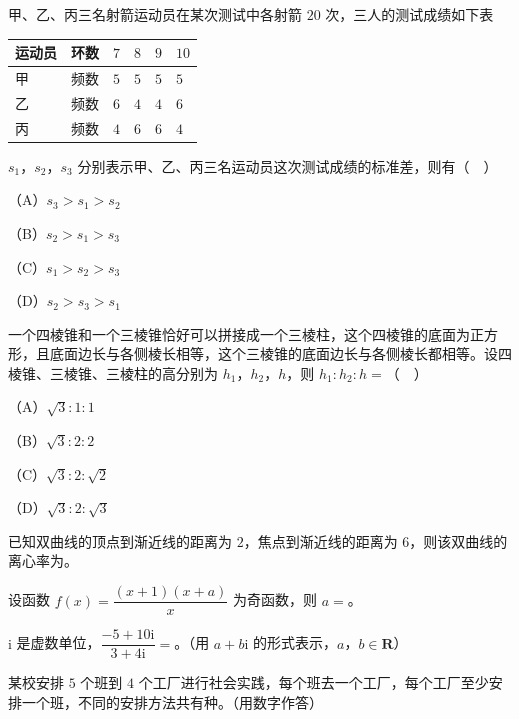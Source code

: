 \begin{question}
甲、乙、丙三名射箭运动员在某次测试中各射箭 $20$ 次，三人的测试成绩如下表

\begin{center}
\begin{tabular}{llllll}
\toprule
运动员 & 环数 & $7$ & $8$ & $9$ & $10$ \\
\midrule
甲 & 频数 & $5$ & $5$ & $5$ & $5$ \\
乙 & 频数 & $6$ & $4$ & $4$ & $6$ \\
丙 & 频数 & $4$ & $6$ & $6$ & $4$ \\
\bottomrule
\end{tabular}
\end{center}

$s_1$，$s_2$，$s_3$ 分别表示甲、乙、丙三名运动员这次测试成绩的标准差，则有（　）

（A）$s_3>s_1>s_2$

（B）$s_2>s_1>s_3$

（C）$s_1>s_2>s_3$

（D）$s_2>s_3>s_1$

\end{question}
\begin{question}
一个四棱锥和一个三棱锥恰好可以拼接成一个三棱柱，这个四棱锥的底面为正方形，且底面边长与各侧棱长相等，这个三棱锥的底面边长与各侧棱长都相等。设四棱锥、三棱锥、三棱柱的高分别为 $h_1$，$h_2$，$h$，则 $h_1:h_2:h=$（　）

（A）$\sqrt3:1:1$

（B）$\sqrt3:2:2$

（C）$\sqrt3:2:\sqrt2$

（D）$\sqrt3:2:\sqrt3$

\end{question}

\begin{question}
已知双曲线的顶点到渐近线的距离为 $2$，焦点到渐近线的距离为 $6$，则该双曲线的离心率为\gkblank{}。

\end{question}
\begin{question}
设函数 $f(x)=\dfrac{(x+1)(x+a)}{x}$ 为奇函数，则 $a=$\gkblank{}。

\end{question}
\begin{question}
$\mathrm i$ 是虚数单位，$\dfrac{-5+10\mathrm i}{3+4\mathrm i}=$\gkblank{}。（用 $a+b\mathrm i$ 的形式表示，$a$，$b\in\mathbf R$）

\end{question}
\begin{question}
某校安排 $5$ 个班到 $4$ 个工厂进行社会实践，每个班去一个工厂，每个工厂至少安排一个班，不同的安排方法共有\gkblank{}种。（用数字作答）

\end{question}

